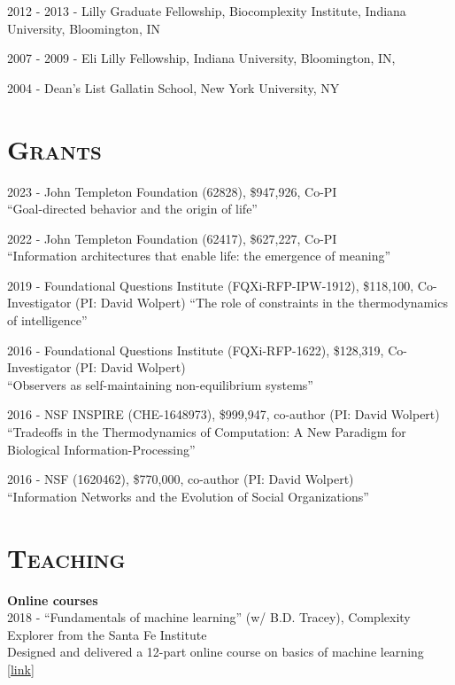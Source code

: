 \documentclass[margin,line,centered]{res}
\begin{document}
\begin{resume}
2012 - 2013 - Lilly Graduate Fellowship, Biocomplexity Institute, Indiana University, Bloomington, IN

2007 - 2009 - Eli Lilly Fellowship, Indiana University, Bloomington, IN, 

2004 - Dean's List Gallatin School, New York University, NY

\section{\textsc{Grants}}

2023 - John Templeton Foundation (62828), \$947,926, Co-PI\\
``Goal-directed behavior and the origin of life''

2022 - John Templeton Foundation (62417), \$627,227, Co-PI\\
``Information architectures that enable life: the emergence of meaning''

2019 - Foundational Questions Institute (FQXi-RFP-IPW-1912),  \$118,100, Co-Investigator (PI: David Wolpert)
``The role of constraints in the thermodynamics of intelligence'' 

2016 - Foundational Questions Institute (FQXi-RFP-1622), \$128,319, Co-Investigator (PI: David Wolpert)\\
``Observers as self-maintaining non-equilibrium systems''

2016 - NSF INSPIRE (CHE-1648973), \$999,947, co-author (PI: David Wolpert)\\
``Tradeoffs in the Thermodynamics of Computation: A New Paradigm for Biological Information-Processing''

2016 - NSF (1620462), \$770,000, co-author (PI: David Wolpert)\\
``Information Networks and the Evolution of Social Organizations'' 



\section{\textsc{Teaching}}

\textbf{Online courses}\\
2018 - ``Fundamentals of machine learning'' (w/ B.D. Tracey), Complexity Explorer from the Santa Fe Institute\\
Designed and delivered a 12-part online course on basics of machine learning {[}\href{https://www.complexityexplorer.org/courses/81-fundamentals-of-machine-learning}{link}{]}


\end{resume}
\end{document}

